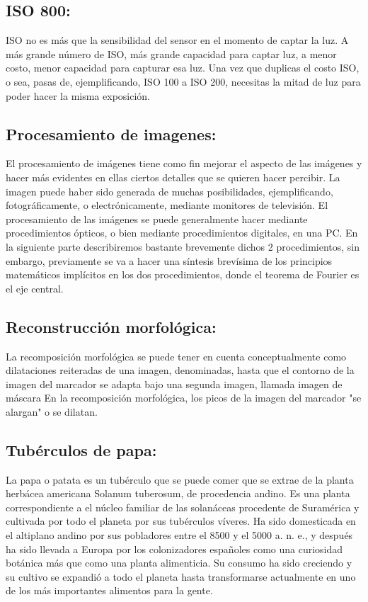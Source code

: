 	\subsection{\textbf{ISO 800:}} ISO no es más que la sensibilidad del sensor en el momento de captar la luz. A más grande número de ISO, más grande capacidad para captar luz, a menor costo, menor capacidad para capturar esa luz. Una vez que duplicas el costo ISO, o sea, pasas de, ejemplificando, ISO 100 a ISO 200, necesitas la mitad de luz para poder hacer la misma exposición.
	\\ 
	
	\subsection{\textbf{Procesamiento de imagenes:}} El procesamiento de imágenes tiene como fin mejorar el aspecto de las imágenes y hacer más evidentes en ellas ciertos detalles que se quieren hacer percibir. La imagen puede haber sido generada de muchas posibilidades, ejemplificando, fotográficamente, o electrónicamente, mediante monitores de televisión. El procesamiento de las imágenes se puede generalmente hacer mediante procedimientos ópticos, o bien mediante procedimientos digitales, en una PC. En la siguiente parte describiremos bastante brevemente dichos 2 procedimientos, sin embargo, previamente se va a hacer una síntesis brevísima de los principios matemáticos implícitos en los dos procedimientos, donde el teorema de Fourier es el eje central.
	\\ 
	
	\subsection{\textbf{Reconstrucción morfológica:}} La recomposición morfológica se puede tener en cuenta conceptualmente como dilataciones reiteradas de una imagen, denominadas, hasta que el contorno de la imagen del marcador se adapta bajo una segunda imagen, llamada imagen de máscara En la recomposición morfológica, los picos de la imagen del marcador "se alargan" o se dilatan.
	\\ 
	
	\subsection{\textbf{Tubérculos de papa:}} La papa o patata es un tubérculo que se puede comer que se extrae de la planta herbácea americana Solanum tuberosum, de procedencia andino. Es una planta correspondiente a el núcleo familiar de las solanáceas procedente de Suramérica y cultivada por todo el planeta por sus tubérculos víveres. Ha sido domesticada en el altiplano andino por sus pobladores entre el 8500 y el 5000 a. n. e., y después ha sido llevada a Europa por los colonizadores españoles como una curiosidad botánica más que como una planta alimenticia. Su consumo ha sido creciendo y su cultivo se expandió a todo el planeta hasta transformarse actualmente en uno de los más importantes alimentos para la gente.
	\\ 
	
